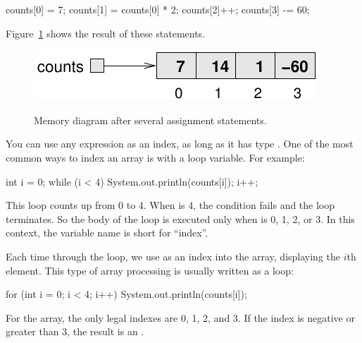 \begin{code}
counts[0] = 7;
counts[1] = counts[0] * 2;
counts[2]++;
counts[3] -= 60;
\end{code}

Figure~\ref{fig.array2} shows the result of these statements.

\begin{figure}[!ht]
\begin{center}
\includegraphics[alt={Memory diagram showing the same array after assignment statements have changed the values of elements at indexes 0, 1, 2, and 3}]{figs/array2.pdf}
\caption{Memory diagram after several assignment statements.}
\label{fig.array2}
\end{center}
\end{figure}

You can use any expression as an index, as long as it has type .
One of the most common ways to index an array is with a loop variable.
For example:

\begin{code}
int i = 0;
while (i < 4) {
    System.out.println(counts[i]);
    i++;
}
\end{code}

This  loop counts up from 0 to 4.
When  is 4, the condition fails and the loop terminates.
So the body of the loop is executed only when  is 0, 1, 2, or 3.
In this context, the variable name  is short for ``index''.


Each time through the loop, we use  as an index into the array, displaying the $i$th element.
This type of array processing is usually written as a  loop:

\begin{code}
for (int i = 0; i < 4; i++) {
    System.out.println(counts[i]);
}
\end{code}


For the  array, the only legal indexes are 0, 1, 2, and 3.
If the index is negative or greater than 3, the result is an .


